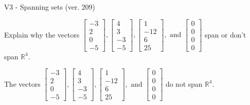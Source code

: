 \begin{exercise}
  \begin{exerciseTitle}V3 - Spanning sets (ver. 209)\end{exerciseTitle}
  \begin{exerciseStatement}
    Explain why the vectors \(\left[\begin{array}{r}
-3 \\
2 \\
0 \\
-5
\end{array}\right] , \left[\begin{array}{r}
4 \\
3 \\
-3 \\
-5
\end{array}\right] , \left[\begin{array}{r}
1 \\
-12 \\
6 \\
25
\end{array}\right] , \text{ and } \left[\begin{array}{r}
0 \\
0 \\
0 \\
0
\end{array}\right]\) span or don't span \(\mathbb{R}^4\). 
	


  \end{exerciseStatement}
  \begin{exerciseAnswer}
   The vectors \(\left[\begin{array}{r}
-3 \\
2 \\
0 \\
-5
\end{array}\right] , \left[\begin{array}{r}
4 \\
3 \\
-3 \\
-5
\end{array}\right] , \left[\begin{array}{r}
1 \\
-12 \\
6 \\
25
\end{array}\right] , \text{ and } \left[\begin{array}{r}
0 \\
0 \\
0 \\
0
\end{array}\right]\) 
  	 do not  
	span \(\mathbb{R}^4\).
  


  \end{exerciseAnswer}
\end{exercise}